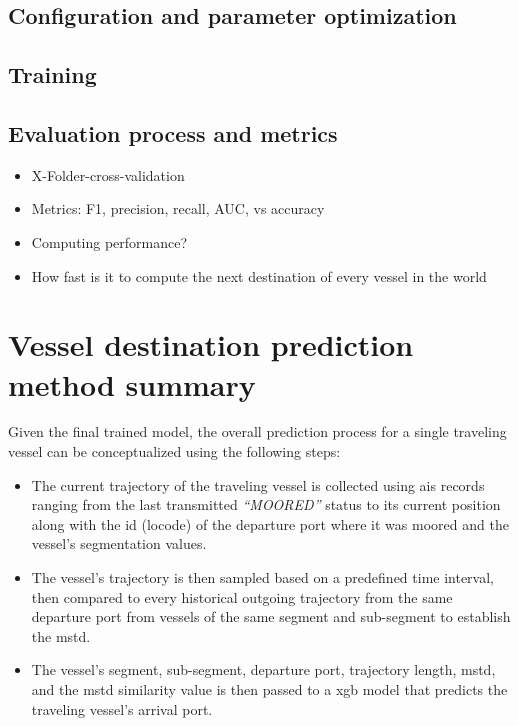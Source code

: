 \subsection{Configuration and parameter optimization}

\subsection{Training}

\subsection{Evaluation process and metrics}

\begin{itemize}
    \item X-Folder-cross-validation
    \item Metrics: F1, precision, recall, AUC, vs accuracy
    \item Computing performance?
    \item How fast is it to compute the next destination of every vessel in the world
\end{itemize}

\section{Vessel destination prediction method summary}

Given the final trained model, the overall prediction process for a single traveling vessel can be conceptualized using the following steps:

\begin{itemize}
    \item The current trajectory of the traveling vessel is collected using \acrshort{ais} records ranging from the last transmitted \textit{``MOORED''} status to its current position along with the id (\gls{locode}) of the departure port where it was moored and the vessel's segmentation values.
    \item The vessel's trajectory is then sampled based on a predefined time interval, then compared to every historical outgoing trajectory from the same departure port from vessels of the same segment and sub-segment to establish the \acrfull{mstd}.
    \item The vessel's segment, sub-segment, departure port, trajectory length, \acrshort{mstd}, and the \acrshort{mstd} similarity value is then passed to a \acrshort{xgb} model that predicts the traveling vessel's arrival port.
\end{itemize}
